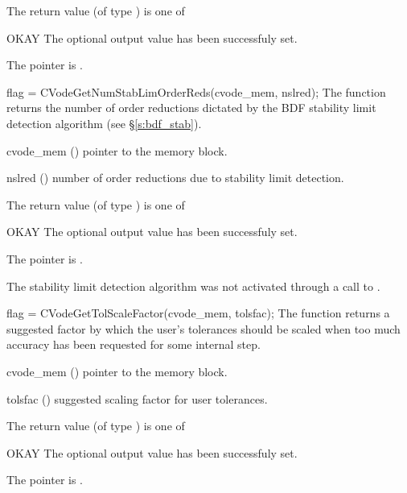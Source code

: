 {
  The return value  (of type ) is one of
  \begin{args}
  \item[OKAY] 
    The optional output value has been successfuly set.
  \item[\Id{CVG\_NO\_MEM}]
    The  pointer is .
  \end{args}
}
{}
{
  flag = CVodeGetNumStabLimOrderReds(cvode\_mem, nslred);
}
{
  The function  returns the
  number of order reductions dictated by the BDF stability limit 
  detection algorithm (see \S\ref{s:bdf_stab}).
}
{
  \begin{args}
  \item[cvode\_mem] ()
    pointer to the {\cvodes} memory block.
  \item[nslred] ()
    number of order reductions due to stability limit detection.
  \end{args}
}
{
  The return value  (of type ) is one of
  \begin{args}
  \item[OKAY] 
    The optional output value has been successfuly set.
  \item[\Id{CVG\_NO\_MEM}]
    The  pointer is .
  \item[\Id{CVG\_NO\_SLDET}]
    The stability limit detection algorithm was not activated 
    through a call to .
  \end{args}
}
{}
{
  flag = CVodeGetTolScaleFactor(cvode\_mem, tolsfac);
}
{
  The function  returns a
  suggested factor by which the user's tolerances 
  should be scaled when too much accuracy has been 
  requested for some internal step.
}
{
  \begin{args}
  \item[cvode\_mem] ()
    pointer to the {\cvodes} memory block.
  \item[tolsfac] ()
    suggested scaling factor for user tolerances.
  \end{args}
}
{
  The return value  (of type ) is one of
  \begin{args}
  \item[OKAY] 
    The optional output value has been successfuly set.
  \item[\Id{CVG\_NO\_MEM}]
    The  pointer is .
  \end{args}
}
